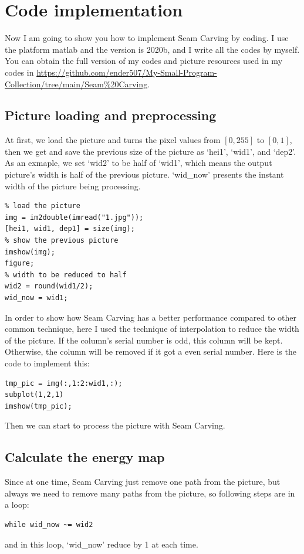 \documentclass[final]{cvpr}
\begin{document}
\section{Code implementation}
Now I am going to show you how to implement Seam Carving by coding. I use the platform matlab and the version is 2020b, and I write all the codes by myself. You can obtain the full version of my codes and picture resources used in my codes in \url{https://github.com/ender507/My-Small-Program-Collection/tree/main/Seam%20Carving}.

\subsection{Picture loading and preprocessing}
At first, we load the picture and turns the pixel values from $[0,255]$ to $[0,1]$, then we get and save the previous size of the picture as `hei1', `wid1', and `dep2'. As an exmaple, we set `wid2' to be half of `wid1', which means the output picture's width is half of the previous picture. `wid\_now' presents the instant width of the picture being processing.
\begin{lstlisting}
% load the picture
img = im2double(imread("1.jpg"));
[hei1, wid1, dep1] = size(img);
% show the previous picture
imshow(img);    
figure;
% width to be reduced to half
wid2 = round(wid1/2);
wid_now = wid1;
\end{lstlisting}

In order to show how Seam Carving has a better performance compared to other common technique, here I used the technique of interpolation to reduce the width of the picture. If the column's serial number is odd, this column will be kept. Otherwise, the column will be removed if it got a even serial number. Here is the code to implement this:
\begin{lstlisting}
tmp_pic = img(:,1:2:wid1,:);
subplot(1,2,1)
imshow(tmp_pic);
\end{lstlisting}

Then we can start to process the picture with Seam Carving.
\subsection{Calculate the energy map}
Since at one time, Seam Carving just remove one path from the picture, but always we need to remove many paths from the picture, so following steps are in a loop:
\begin{lstlisting}
while wid_now ~= wid2
\end{lstlisting}
and in this loop, `wid\_now' reduce by 1 at each time. 
\end{document}
